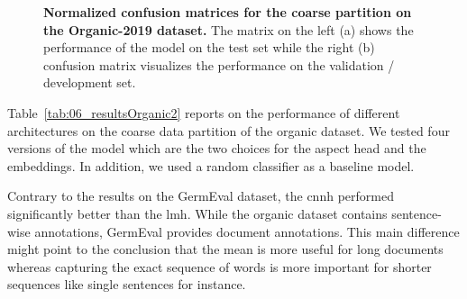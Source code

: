 \begin{figure}[htb]
    \centering
    
    \caption{\textbf{Normalized confusion matrices for the coarse partition on the Organic-2019 dataset.} The matrix on the left {(a)} shows the performance of the model on the test set while the right {(b)} confusion matrix visualizes the performance on the validation / development set.}
    \label{fig:06_ORG_coarse_cmatrices}
\end{figure}

\bigskip
Table~\ref{tab:06_resultsOrganic2} reports on the performance of different architectures on the coarse data partition of the organic dataset. We tested four versions of the model which are the two choices for the aspect head and the embeddings. In addition, we used a random classifier as a baseline model.
\medskip

Contrary to the results on the GermEval dataset, the \acrfull{cnnh} performed significantly better than the \acrfull{lmh}. While the organic dataset contains sentence-wise annotations, GermEval provides document annotations. This main difference might point to the conclusion that the mean is more useful for long documents whereas capturing the exact sequence of words is more important for shorter sequences like single sentences for instance. 
\bigskip

